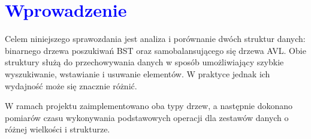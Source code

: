 \documentclass{article}
\begin{document}
	\titleformat{\section}{\Huge\bfseries}{\thesection}{2em}{}
	
	\section*{\textcolor{blue}{Wprowadzenie}}
	\noindent Celem niniejszego sprawozdania jest analiza i porównanie dwóch struktur danych: binarnego drzewa poszukiwań BST oraz samobalansującego się drzewa AVL. Obie struktury służą do przechowywania danych w sposób umożliwiający szybkie wyszukiwanie, wstawianie i usuwanie elementów. W praktyce jednak ich wydajność może się znacznie różnić.
	
	\noindent W ramach projektu zaimplementowano oba typy drzew, a następnie dokonano pomiarów czasu wykonywania podstawowych operacji dla zestawów danych o różnej wielkości i strukturze.
	
	\titleformat{\section}{\Large\bfseries}{\thesection}{2em}{}
\end{document}

